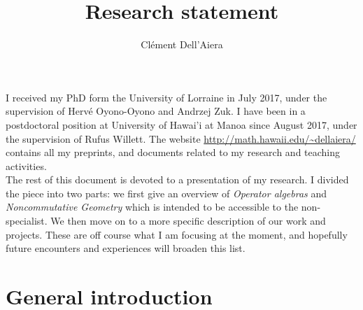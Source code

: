 \documentclass[a4paper]{article}
\title{Research statement}
\date{}
\author{ Cl\'ement Dell'Aiera}
\begin{document}
\maketitle

I received my PhD form the University of Lorraine in July 2017, under the supervision of Herv\'e Oyono-Oyono and Andrzej Zuk. I have been in a postdoctoral position at University of Hawai'i at Manoa since August 2017, under the supervision of Rufus Willett. The website \url{http://math.hawaii.edu/~dellaiera/} contains all my preprints, and documents related to my research and teaching activities.\\ 

The rest of this document is devoted to a presentation of my research. I divided the piece into two parts: we first give an overview of \textit{Operator algebras} and \textit{Noncommutative Geometry} which is intended to be accessible to the non-specialist. We then move on to a more specific description of our work and projects. These are off course what I am focusing at the moment, and hopefully future encounters and experiences will broaden this list.

\section{General introduction}






 
\end{document}
